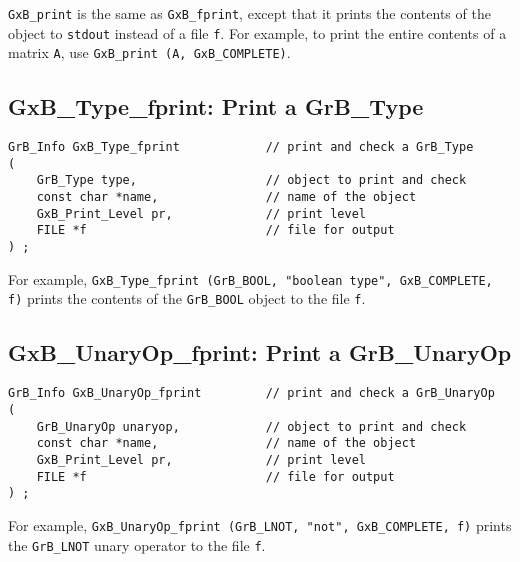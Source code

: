 \documentclass[12pt]{article}
\begin{document}
\verb'GxB_print' is the same as \verb'GxB_fprint', except that it prints the
contents of the object to \verb'stdout' instead of a file \verb'f'.  For
example, to print the entire contents of a matrix \verb'A',  use
\verb'GxB_print (A, GxB_COMPLETE)'.

\subsection{{\sf GxB\_Type\_fprint:} Print a {\sf GrB\_Type}}

\begin{mdframed}[userdefinedwidth=6in]
{\footnotesize
\begin{verbatim}
GrB_Info GxB_Type_fprint            // print and check a GrB_Type
(
    GrB_Type type,                  // object to print and check
    const char *name,               // name of the object
    GxB_Print_Level pr,             // print level
    FILE *f                         // file for output
) ;
\end{verbatim} } \end{mdframed}

For example, \verb'GxB_Type_fprint (GrB_BOOL, "boolean type", GxB_COMPLETE, f)'
prints the contents of the \verb'GrB_BOOL' object to the file \verb'f'.

\newpage
\subsection{{\sf GxB\_UnaryOp\_fprint:} Print a {\sf GrB\_UnaryOp}}

\begin{mdframed}[userdefinedwidth=6in]
{\footnotesize
\begin{verbatim}
GrB_Info GxB_UnaryOp_fprint         // print and check a GrB_UnaryOp
(
    GrB_UnaryOp unaryop,            // object to print and check
    const char *name,               // name of the object
    GxB_Print_Level pr,             // print level
    FILE *f                         // file for output
) ;
\end{verbatim} } \end{mdframed}

For example,
\verb'GxB_UnaryOp_fprint (GrB_LNOT, "not", GxB_COMPLETE, f)'
prints the \verb'GrB_LNOT' unary operator to the file \verb'f'.
\end{document}
